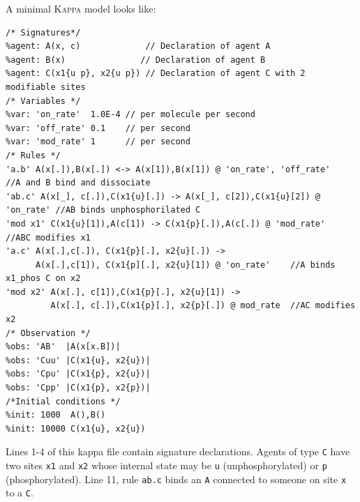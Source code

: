 \documentclass[11pt]{book}
\def\Kappa{\textsc{Kappa}}
\def\ttt#1{\texttt{#1}}
\begin{document}
A minimal \Kappa{} model looks like:




\begin{lstlisting}[language=kappa]
/* Signatures*/
%agent: A(x, c)             // Declaration of agent A
%agent: B(x)               // Declaration of agent B
%agent: C(x1{u p}, x2{u p}) // Declaration of agent C with 2 modifiable sites
/* Variables */
%var: 'on_rate'  1.0E-4 // per molecule per second
%var: 'off_rate' 0.1    // per second
%var: 'mod_rate' 1      // per second
/* Rules */
'a.b' A(x[.]),B(x[.]) <-> A(x[1]),B(x[1]) @ 'on_rate', 'off_rate'       //A and B bind and dissociate
'ab.c' A(x[_], c[.]),C(x1{u}[.]) -> A(x[_], c[2]),C(x1{u}[2]) @ 'on_rate' //AB binds unphosphorilated C
'mod x1' C(x1{u}[1]),A(c[1]) -> C(x1{p}[.]),A(c[.]) @ 'mod_rate'        //ABC modifies x1
'a.c' A(x[.],c[.]), C(x1{p}[.], x2{u}[.]) ->
      A(x[.],c[1]), C(x1{p][.], x2{u}[1]) @ 'on_rate'    //A binds x1_phos C on x2
'mod x2' A(x[.], c[1]),C(x1{p}[.], x2{u}[1]) ->
         A(x[.], c[.]),C(x1{p}[.], x2{p}[.]) @ mod_rate  //AC modifies x2
/* Observation */
%obs: 'AB'  |A(x[x.B])|
%obs: 'Cuu' |C(x1{u}, x2{u})|
%obs: 'Cpu' |C(x1{p}, x2{u})|
%obs: 'Cpp' |C(x1{p}, x2{p})|
/*Initial conditions */
%init: 1000  A(),B()
%init: 10000 C(x1{u}, x2{u})
\end{lstlisting}

Lines 1-4 of this kappa file contain
signature
declarations. Agents of type
\ttt{C} have two sites \ttt{x1} and \ttt{x2} whose internal state may
be \ttt{u} (unphosphorylated) or \ttt{p} (phosphorylated).
Line 11, rule \ttt{{\textquotesingle}ab.c{\textquotesingle}} binds an
\ttt{A} connected to someone on site \ttt{x} to a \ttt{C}.
\end{document}
